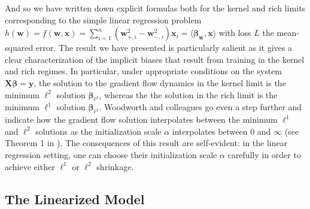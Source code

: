 \documentclass{article}
\begin{document}
And so we have written down explicit formulas both for the kernel and rich limits corresponding to the simple linear regression problem $h(\boldsymbol{w}) = f(\boldsymbol{w}, \boldsymbol{x}) = \sum_{i=1}^n(\boldsymbol{w}_{+, i}^2 - \boldsymbol{w}_{-, i}^2)\boldsymbol{x}_i = \langle \boldsymbol{\beta}_{\boldsymbol{w}}, \boldsymbol{x} \rangle $ with loss $L$ the mean-squared error. The result we have presented is particularly salient as it gives a clear characterization of the implicit biases that result from training in the kernel and rich regimes. In particular, under appropriate conditions on the system $\boldsymbol{X} \boldsymbol{\beta} = \boldsymbol{y}$, the solution to the gradient flow dynamics in the kernel limit is the minimum $\ell^2$ solution $\boldsymbol{\beta}_{\ell^2}$, whereas the the solution in the rich limit is the minimum $\ell^1$ solution $\boldsymbol{\beta}_{\ell^1}$. Woodworth and colleagues go even a step further and indicate how the gradient flow solution interpolates between the minimum $\ell^1$ and $\ell^2 $ solutions as the initialization scale $\alpha$ interpolates between $0$ and $\infty$ (see Theorem 1 in \cite{woodworth2020kernel}). The consequences of this result are self-evident: in the linear regression setting, one can choose their initialization scale $\alpha$ carefully in order to achieve either $\ell^1$ or $\ell^2$ shrinkage.

\subsection{The Linearized Model}
\end{document}
